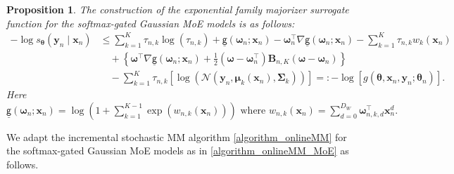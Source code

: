 \documentclass{article}
\newcommand{\mdg}{softmax-gated Gaussian MoE }
\newcommand{\nn}{\nonumber} %
\newcommand{\cN}{\mathcal{N}}
\newtheorem{proposition}{Proposition}
\def\sfg{\mathsf{g}}
\def\vmu{{\bm{\mu}}}
\def\vomega{{\bm{\omega}}}
\def\vtheta{{\bm{\theta}}}
\def\vx{{\bm{x}}}
\def\vy{{\bm{y}}}
\def\mB{{\bm{B}}}
\def\mSigma{{\bm{\Sigma}}}
\begin{document}
\begin{proposition}\label{proposition_surrogate_construction_SGMoE} 
The construction of the exponential family majorizer surrogate function for the \mdg models is as follows:
\begin{align} 
	-\log s_{\vtheta}(\vy_n\mid \vx_n) 
    &\le\sum_{k=1}^{K}\tau_{n,k}\log(\tau_{n,k})+\underline{\sfg}(\vomega_n;\vx_n)-\vomega_{n}^{\top}\nabla \underline{\sfg}(\vomega_n;\vx_n)-\sum_{k=1}^{K}\tau_{n,k}w_k(\vx_n)\nn\\
    &\quad+\left\{\vomega^{\top}\nabla \underline{\sfg}(\vomega_n;\vx_n)+\frac{1}{2}(\vomega-\vomega_{n}^{\top})\mB_{n,K}\left(\vomega-\vomega_n\right)\right\}\nn
   \\
    &\quad-\sum_{k=1}^{K}\tau_{n,k}\left[\log(\cN(\vy_n,\vmu_k(\vx_n),\mSigma_k))\right]=:-\log[g(\vtheta, \vx_{n},\vy_{n}; \vtheta_{n})].\label{eq_surrogate_Taylor_SGGMoE} 
\end{align}
Here $\underline{\sfg}(\vomega_n;\vx_n)=\log\left(1+\displaystyle\sum_{k=1}^{K-1}\exp\left(w_{n,k}(\vx_n)\right)\right) \text{ where } w_{n,k}(\vx_n)=\displaystyle\sum_{d=0}^{D_W}\vomega_{n,k,d}^{\top}\vx_n^{d}.$
\end{proposition}

We adapt the incremental stochastic MM algorithm \cref{algorithm_onlineMM} for the \mdg models as in \cref{algorithm_onlineMM_MoE} as follows.
\end{document}
